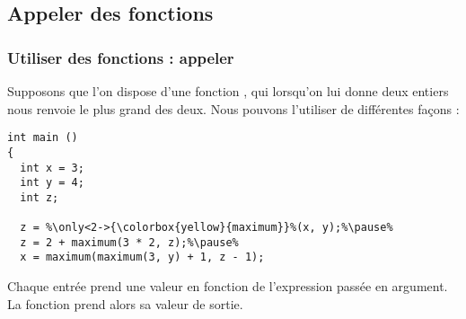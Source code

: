 \documentclass[xcolor=pdftex,svgnames,table]{beamer}
\begin{document}
\subsection{Appeler des fonctions}
\begin{frame}[fragile]
  \frametitle{Utiliser des fonctions : appeler}

Supposons que l'on dispose d'une fonction , qui lorsqu'on
lui donne deux entiers nous renvoie le plus grand des deux.
\pause
Nous pouvons l'utiliser de différentes façons :
\begin{lstlisting}[escapechar={\%},basicstyle=\ttfamily\small]
int main ()
{
  int x = 3;
  int y = 4;
  int z;

  z = %\only<2->{\colorbox{yellow}{maximum}}%(x, y);%\pause%
  z = 2 + maximum(3 * 2, z);%\pause%
  x = maximum(maximum(3, y) + 1, z - 1);
\end{lstlisting}
\pause
Chaque entrée prend une valeur en fonction de l'expression passée en
argument. La fonction prend alors sa valeur de sortie.
\end{frame}
\end{document}
